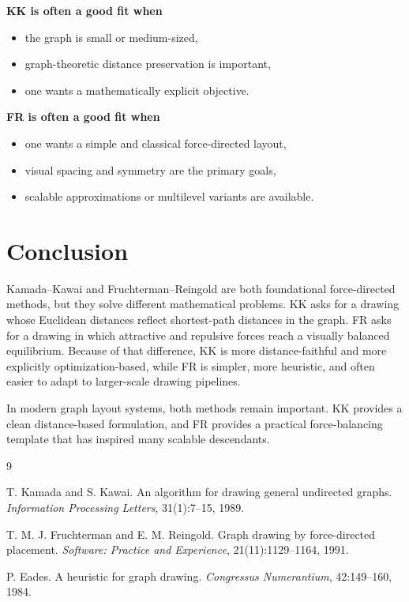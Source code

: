 \documentclass[11pt]{article}
\begin{document}
\textbf{KK is often a good fit when}
\begin{itemize}[leftmargin=1.5em]
\item the graph is small or medium-sized,
\item graph-theoretic distance preservation is important,
\item one wants a mathematically explicit objective.
\end{itemize}

\textbf{FR is often a good fit when}
\begin{itemize}[leftmargin=1.5em]
\item one wants a simple and classical force-directed layout,
\item visual spacing and symmetry are the primary goals,
\item scalable approximations or multilevel variants are available.
\end{itemize}

\section{Conclusion}

Kamada--Kawai and Fruchterman--Reingold are both foundational force-directed
methods, but they solve different mathematical problems. KK asks for a drawing
whose Euclidean distances reflect shortest-path distances in the graph. FR asks
for a drawing in which attractive and repulsive forces reach a visually balanced
equilibrium. Because of that difference, KK is more distance-faithful and more
explicitly optimization-based, while FR is simpler, more heuristic, and often
easier to adapt to larger-scale drawing pipelines.

In modern graph layout systems, both methods remain important. KK provides a
clean distance-based formulation, and FR provides a practical force-balancing
template that has inspired many scalable descendants.

\begin{thebibliography}{9}

T. Kamada and S. Kawai.
\newblock An algorithm for drawing general undirected graphs.
\newblock \emph{Information Processing Letters}, 31(1):7--15, 1989.

T. M. J. Fruchterman and E. M. Reingold.
\newblock Graph drawing by force-directed placement.
\newblock \emph{Software: Practice and Experience}, 21(11):1129--1164, 1991.

P. Eades.
\newblock A heuristic for graph drawing.
\newblock \emph{Congressus Numerantium}, 42:149--160, 1984.

\end{thebibliography}
\end{document}
